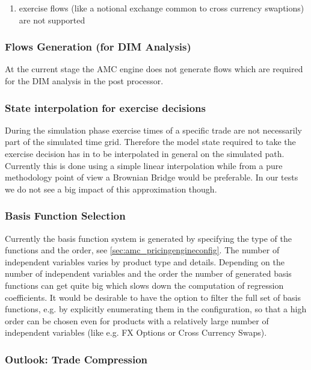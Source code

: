\documentclass[12pt, a4paper]{article}
\begin{document}
{\begin{appendix}
\begin{enumerate}
\item exercise flows (like a notional exchange common to cross currency swaptions) are not supported
\end{enumerate}

\subsubsection*{Flows Generation (for DIM Analysis)}

At the current stage the AMC engine does not generate flows which are required for the DIM analysis in the post
processor.

\subsubsection*{State interpolation for exercise decisions}

During the simulation phase exercise times of a specific trade are not necessarily part of the simulated time
grid. Therefore the model state required to take the exercise decision has in to be interpolated in general on the
simulated path. Currently this is done using a simple linear interpolation while from a pure methodology point of view a
Brownian Bridge would be preferable. In our tests we do not see a big impact of this approximation though.

\subsubsection*{Basis Function Selection}

Currently the basis function system is generated by specifying the type of the functions and the order, see
\ref{sec:amc_pricingengineconfig}. The number of independent variables varies by product type and details. Depending on
the number of independent variables and the order the number of generated basis functions can get quite big which slows
down the computation of regression coefficients. It would be desirable to have the option to filter the full set of
basis functions, e.g. by explicitly enumerating them in the configuration, so that a high order can be chosen even for
products with a relatively large number of independent variables (like e.g. FX Options or Cross Currency Swaps).

\subsubsection{Outlook: Trade Compression}


\end{appendix}}
\end{document}
